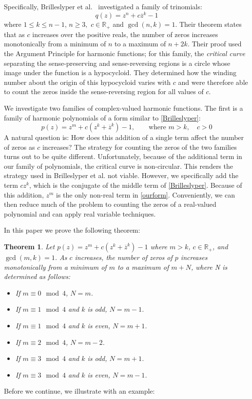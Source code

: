 \documentclass{amsart}
\newtheorem{theorem}{Theorem}
\theoremstyle{definition}
\theoremstyle{remark}
\begin{document}
Specifically, Brilleslyper et al.\ \cite{BBDHS} investigated a family of trinomials:
\begin{equation}\label{Brilleslyper}
    q(z) =  z^n + c\overline{z}^k -1
\end{equation}
where $1 \leq k \leq n-1$, $n\geq3,$ $c \in \mathbb{R}_{+}$ and $\gcd(n,k) = 1$. 
Their theorem states that as $c$ increases over the positive reals, the number of zeros increases monotonically from a minimum of $n$ to a maximum of $n + 2k$. Their proof used the Argument Principle for harmonic functions; for this family, the {\em critical curve} separating the sense-preserving and sense-reversing regions is a circle whose image under the function is a hypocycloid. They determined how the winding number about the origin of this hypocycloid varies with $c$ and were therefore able to count the zeros inside the sense-reversing region for all values of $c$. 

We investigate two families of complex-valued harmonic functions. The first is a family of harmonic polynomials of a form similar to \eqref{Brilleslyper}: 
\begin{equation}\label{ourform}
   p(z) = z^m + c(z^k +\overline{z}^k) -1, \qquad \text{where } m > k, \quad c > 0
\end{equation}
A natural question is: How does this addition of a single term affect the number of zeros as $c$ increases? The strategy for counting the zeros of the two families turns out to be quite different.  Unfortunately, because of the additional term in our family of polynomials, the critical curve is non-circular. This renders the strategy used in Brilleslyper et al. \cite{BBDHS} not viable. However, we specifically add the term $c{z}^k$, which is the conjugate of the middle term of \eqref{Brilleslyper}. Because of this addition, $z^m$ is the only non-real term in \eqref{ourform}. Conveniently, we can then reduce much of the problem to counting the zeros of a real-valued polynomial and can apply real variable techniques.

In this paper we prove the following theorem:
\begin{theorem}\label{theorem1}
Let $p(z) = z^m+c(z^k+\overline{z}^k)-1$ where $m > k$, $c \in \mathbb{R_+}$, and $\gcd(m,k) = 1$. As $c$ increases, the number of zeros of $p$ increases monotonically from a minimum of $m$ to a maximum of $m + N$, where N is determined as follows:
    \begin{itemize}
    \item If $m \equiv 0 \mod 4$, $N = m$.
    \item If $m \equiv 1 \mod 4$ and $k$ is odd, $N = m-1$.
    \item If $m \equiv 1 \mod 4$ and $k$ is even, $N = m+1$.
    \item If $m \equiv 2 \mod 4$, $N = m-2$.
    \item If $m \equiv 3 \mod 4$ and $k$ is odd, $N = m+1$.
    \item If $m \equiv 3 \mod 4$ and $k$ is even, $N = m-1$.
\end{itemize}
\end{theorem}
Before we continue, we illustrate with an example: 
\end{document}

